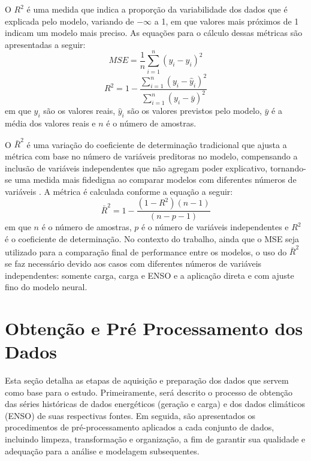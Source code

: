 O $R^2$ é uma medida que indica a proporção da variabilidade dos dados que é explicada pelo modelo, variando de 
$ - \infty $ a 1, em que valores mais próximos de 1 indicam um modelo mais preciso. As equações para o cálculo dessas métricas
são apresentadas a seguir:
\begin{equation}
    \label{eq:mse}
    MSE = \frac{1}{n} \sum_{i=1}^{n} (y_i - \hat{y}_i)^2
\end{equation}
\begin{equation}
    \label{eq:r2}
    R^2 = 1 - \frac{\sum_{i=1}^{n} (y_i - \hat{y}_i)^2}{\sum_{i=1}^{n} (y_i - \bar{y})^2}
\end{equation}
em que $ y_i $ são os valores reais, $ \hat{y}_i $ são os valores previstos pelo modelo, $ \bar{y} $ é a média dos valores 
reais e $ n $ é o número de amostras.

O $\bar{R}^2$ é uma variação do coeficiente de determinação tradicional que ajusta a métrica com base no número de variáveis preditoras 
no modelo, compensando a inclusão de variáveis independentes que não agregam poder explicativo, tornando-se uma medida mais fidedigna 
ao comparar modelos com diferentes números de variáveis \cite{Ezekiel1930}. A métrica é calculada conforme a equação a seguir:
\begin{equation}
    \label{eq:r2_ajustado}
    \bar{R}^2 = 1 -  \frac{\left(1 - R^2\right) \left(n - 1\right)}{\left(n - p - 1\right)}
\end{equation}
em que $n$ é o número de amostras, $ p $ é o número de variáveis independentes e $R^2$ é o coeficiente de determinação. No contexto do trabalho,
ainda que o MSE seja utilizado para a comparação final de performance entre os modelos, o uso do $\bar{R}^2$ se faz necessário devido aos
casos com diferentes números de variáveis independentes: somente carga, carga e ENSO e a aplicação direta e com ajuste fino do modelo neural.

\section{Obtenção e Pré Processamento dos Dados} %
Esta seção detalha as etapas de aquisição e preparação dos dados que servem como base para o estudo. Primeiramente, 
será descrito o processo de obtenção das séries históricas de dados energéticos (geração e carga) e dos dados climáticos (ENSO) de 
suas respectivas fontes. Em seguida, são apresentados os procedimentos de pré-processamento aplicados a cada conjunto de dados, 
incluindo limpeza, transformação e organização, a fim de garantir sua qualidade e adequação para a análise e modelagem subsequentes.

